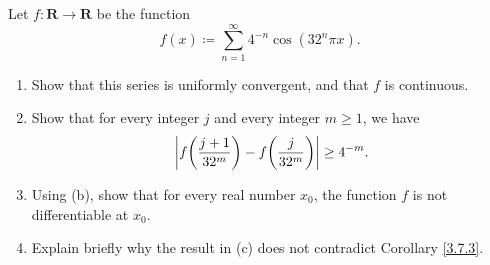 \begin{exercise}\label{ex 4.7.10}
    Let \(f : \mathbf{R} \to \mathbf{R}\) be the function
    \[
        f(x) \coloneqq \sum_{n = 1}^\infty 4^{-n} \cos(32^n \pi x).
    \]
    \begin{enumerate}
        \item Show that this series is uniformly convergent, and that \(f\) is continuous.
        \item Show that for every integer \(j\) and every integer \(m \geq 1\), we have
              \[
                  \abs*{f\bigg(\frac{j + 1}{32^m}\bigg) - f\bigg(\frac{j}{32^m}\bigg)} \geq 4^{-m}.
              \]
        \item Using (b), show that for every real number \(x_0\), the function \(f\) is not differentiable at \(x_0\).
        \item Explain briefly why the result in (c) does not contradict Corollary \ref{3.7.3}.
    \end{enumerate}
\end{exercise}